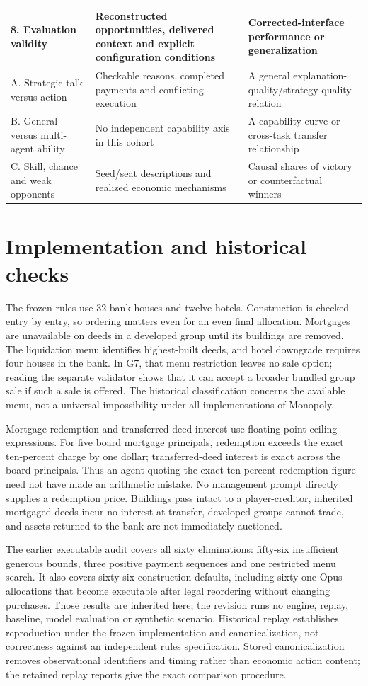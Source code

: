 \begin{longtable}{@{}L{.23\linewidth}L{.35\linewidth}L{.35\linewidth}@{}}
8. Evaluation validity & Reconstructed opportunities, delivered context and explicit configuration conditions & Corrected-interface performance or generalization\\\midrule
A. Strategic talk versus action & Checkable reasons, completed payments and conflicting execution & A general explanation-quality/strategy-quality relation\\
B. General versus multi-agent ability & No independent capability axis in this cohort & A capability curve or cross-task transfer relationship\\
C. Skill, chance and weak opponents & Seed/seat descriptions and realized economic mechanisms & Causal shares of victory or counterfactual winners\\
\bottomrule\end{longtable}
\normalsize

\section{Implementation and historical checks}
\label{app:rules}

The frozen rules use 32 bank houses and twelve hotels. Construction is checked entry by entry, so ordering matters even for an even final allocation. Mortgages are unavailable on deeds in a developed group until its buildings are removed. The liquidation menu identifies highest-built deeds, and hotel downgrade requires four houses in the bank. In G7, that menu restriction leaves no sale option; reading the separate validator shows that it can accept a broader bundled group sale if such a sale is offered. The historical classification concerns the available menu, not a universal impossibility under all implementations of Monopoly.

Mortgage redemption and transferred-deed interest use floating-point ceiling expressions. For five board mortgage principals, redemption exceeds the exact ten-percent charge by one dollar; transferred-deed interest is exact across the board principals. Thus an agent quoting the exact ten-percent redemption figure need not have made an arithmetic mistake. No management prompt directly supplies a redemption price. Buildings pass intact to a player-creditor, inherited mortgaged deeds incur no interest at transfer, developed groups cannot trade, and assets returned to the bank are not immediately auctioned.

The earlier executable audit covers all sixty eliminations: fifty-six insufficient generous bounds, three positive payment sequences and one restricted menu search. It also covers sixty-six construction defaults, including sixty-one Opus allocations that become executable after legal reordering without changing purchases. Those results are inherited here; the revision runs no engine, replay, baseline, model evaluation or synthetic scenario. Historical replay establishes reproduction under the frozen implementation and canonicalization, not correctness against an independent rules specification. Stored canonicalization removes observational identifiers and timing rather than economic action content; the retained replay reports give the exact comparison procedure.

